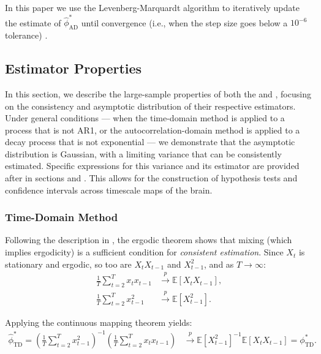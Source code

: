 \documentclass[9pt]{article}
\newcommand{\phitd}{\phi_{\scriptscriptstyle\text{TD}}}
\newcommand{\hatphitd}{\hat{\phi}^*_{\scriptscriptstyle\text{TD}}}
\newcommand{\hatphiad}{\hat{\phi}^*_{\scriptscriptstyle\text{AD}}}
\begin{document}
\noindent In this paper we use the Levenberg-Marquardt algorithm to iteratively update the estimate of $\hatphiad$ until convergence (i.e., when the step size goes below a $10^{-6}$ tolerance) \citep{levenberg_method_1944}.\\

\subsection{Estimator Properties}\label{sec:estimator-properties}
In this section, we describe the large-sample properties of both the  and , focusing on the consistency and asymptotic distribution of their respective estimators. Under general conditions --- when the time-domain method is applied to a process that is not AR1, or the autocorrelation-domain method is applied to a decay process that is not exponential --- we demonstrate that the asymptotic distribution is Gaussian, with a limiting variance that can be consistently estimated. Specific expressions for this variance and its estimator are provided after in sections  and . This allows for the construction of hypothesis tests and confidence intervals across timescale maps of the brain.

\subsubsection{Time-Domain Method}
Following the description in \citet[Theorem~14.29]{hansen_econometrics_2022}, the ergodic theorem shows that mixing (which implies ergodicity) is a sufficient condition for \textit{consistent estimation}. Since $X_t$ is stationary and ergodic, so too are $X_t X_{t-1}$ and $X_{t-1}^2$, and as $T \to \infty$:
\begin{align}
    \frac{1}{T} \sum_{t=2}^T x_t x_{t-1} &\overset{p}{\to} \mathbb{E}[X_t X_{t-1}],\\
    \frac{1}{T} \sum_{t=2}^T x_{t-1}^2 &\overset{p}{\to} \mathbb{E}[X_{t-1}^2].
\end{align}

\noindent Applying the continuous mapping theorem yields:
\begin{align}
    \hatphitd = \left(\frac{1}{T} \sum_{t=2}^T x_{t-1}^2\right)^{-1} \left( \frac{1}{T} \sum_{t=2}^T x_t x_{t-1}\right) &\overset{p}{\to} \mathbb{E}[X_{t-1}^2]^{-1}\mathbb{E}[X_t X_{t-1}] = \phitd^*.
\end{align}
\end{document}
